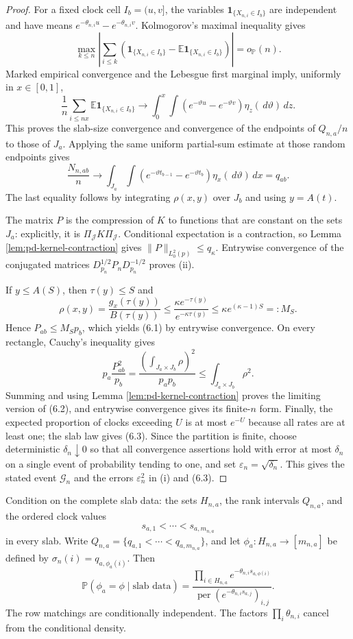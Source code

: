 \documentclass[11pt]{article}
\theoremstyle{remark}
\newcommand{\Pp}{\mathbb P}
\newcommand{\Ee}{\mathbb E}
\newcommand{\one}{\mathbf 1}
\newcommand{\dd}{\,d}
\begin{document}
\begin{proof}
For a fixed clock cell $I_b=(u,v]$, the variables
$\one_{\{X_{n,i}\in I_b\}}$ are independent and have means
$e^{-\theta_{n,i}u}-e^{-\theta_{n,i}v}$.  Kolmogorov's maximal inequality
gives
\[
 \max_{k\le n}\left|\sum_{i\le k}
 \left(\one_{\{X_{n,i}\in I_b\}}
 -\Ee\one_{\{X_{n,i}\in I_b\}}\right)\right|=o_{\Pp}(n).
\]
Marked empirical convergence and the Lebesgue first marginal imply, uniformly
in $x\in[0,1]$,
\[
 \frac1n\sum_{i\le nx}
 \Ee\one_{\{X_{n,i}\in I_b\}}
 \longrightarrow
 \int_0^x\int
 (e^{-\vartheta u}-e^{-\vartheta v})
 \eta_z(\dd\vartheta)\dd z.
\]
This proves the slab-size convergence and convergence of the endpoints of
$Q_{n,a}/n$ to those of $J_a$.  Applying the same uniform partial-sum estimate
at those random endpoints gives
\[
 \frac{N_{n,ab}}n\longrightarrow
 \int_{J_a}\int
 (e^{-\vartheta t_{b-1}}-e^{-\vartheta t_b})
 \eta_x(\dd\vartheta)\dd x=q_{ab}.
\]
The last equality follows by integrating $\rho(x,y)$ over $J_b$ and using
$y=A(t)$.

The matrix $P$ is the compression of $K$ to functions that are constant on the
sets $J_a$: explicitly, it is $\Pi_{\mathcal J}K\Pi_{\mathcal J}$.  Conditional
expectation is a contraction, so Lemma \ref{lem:pd-kernel-contraction} gives
$\|P\|_{L^2_0(p)}\le q_\kappa$.  Entrywise convergence of the conjugated
matrices
$D_{p_n}^{1/2}P_nD_{p_n}^{-1/2}$ proves (ii).

If $y\le A(S)$, then $\tau(y)\le S$ and
\[
 \rho(x,y)
 =\frac{g_x(\tau(y))}{B(\tau(y))}
 \le\frac{\kappa e^{-\tau(y)}}{e^{-\kappa\tau(y)}}
 \le\kappa e^{(\kappa-1)S}=:M_S.
\]
Hence $P_{ab}\le M_Sp_b$, which yields (6.1) by entrywise convergence.  On
every rectangle, Cauchy's inequality gives
\[
 p_a\frac{P_{ab}^2}{p_b}
 =\frac{(\int_{J_a\times J_b}\rho)^2}{p_ap_b}
 \le\int_{J_a\times J_b}\rho^2.
\]
Summing and using Lemma \ref{lem:pd-kernel-contraction} proves the limiting
version of (6.2), and entrywise convergence gives its finite-$n$ form.  Finally,
the expected proportion of clocks exceeding $U$ is at most $e^{-U}$ because
all rates are at least one; the slab law gives (6.3).  Since the partition is finite, choose deterministic $\delta_n\downarrow0$
so that all convergence assertions hold with error at most $\delta_n$ on a
single event of probability tending to one, and set
$\varepsilon_n=\sqrt{\delta_n}$.  This gives the stated event
$\mathcal G_n$ and the errors $\varepsilon_n^2$ in (i) and (6.3).
\end{proof}

Condition on the complete slab data: the sets $H_{n,a}$, the rank intervals
$Q_{n,a}$, and the ordered clock values
\[
        s_{a,1}<\cdots<s_{a,m_{n,a}}
\]
in every slab.  Write
$Q_{n,a}=\{q_{a,1}<\cdots<q_{a,m_{n,a}}\}$, and let
$\phi_a:H_{n,a}\to[m_{n,a}]$ be defined by
$\sigma_n(i)=q_{a,\phi_a(i)}$.  Then
\begin{equation}
 \Pp(\phi_a=\phi\mid\text{slab data})
 =\frac{\prod_{i\in H_{n,a}}e^{-\theta_{n,i}s_{a,\phi(i)}}}
 {\operatorname{per}(e^{-\theta_{n,i}s_{a,j}})_{i,j}}.
 \tag{6.3a}\label{eq:pd-permanental-row}
\end{equation}
The row matchings are conditionally independent.  The factors
$\prod_i\theta_{n,i}$ cancel from the conditional density.
\end{document}
